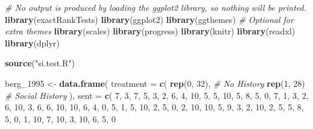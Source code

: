 \documentclass[
]{article}
\newenvironment{Shaded}{\begin{snugshade}}{\end{snugshade}}
\newcommand{\AttributeTok}[1]{\textcolor[rgb]{0.13,0.29,0.53}{#1}}
\newcommand{\CommentTok}[1]{\textcolor[rgb]{0.56,0.35,0.01}{\textit{#1}}}
\newcommand{\DecValTok}[1]{\textcolor[rgb]{0.00,0.00,0.81}{#1}}
\newcommand{\FunctionTok}[1]{\textcolor[rgb]{0.13,0.29,0.53}{\textbf{#1}}}
\newcommand{\NormalTok}[1]{#1}
\newcommand{\OtherTok}[1]{\textcolor[rgb]{0.56,0.35,0.01}{#1}}
\newcommand{\StringTok}[1]{\textcolor[rgb]{0.31,0.60,0.02}{#1}}
\begin{document}
\begin{Shaded}
\begin{Highlighting}[]
\CommentTok{\# No output is produced by loading the ggplot2 library, so nothing will be printed.}
\FunctionTok{library}\NormalTok{(exactRankTests)}
\FunctionTok{library}\NormalTok{(ggplot2)}
\FunctionTok{library}\NormalTok{(ggthemes)   }\CommentTok{\# Optional for extra themes}
\FunctionTok{library}\NormalTok{(scales)}
\FunctionTok{library}\NormalTok{(progress) }
\FunctionTok{library}\NormalTok{(knitr)}
\FunctionTok{library}\NormalTok{(readxl)}
\FunctionTok{library}\NormalTok{(dplyr)}

\FunctionTok{source}\NormalTok{(}\StringTok{"si.test.R"}\NormalTok{)}

\NormalTok{berg\_1995 }\OtherTok{\textless{}{-}} \FunctionTok{data.frame}\NormalTok{(}
    \AttributeTok{treatment =} \FunctionTok{c}\NormalTok{(}
        \FunctionTok{rep}\NormalTok{(}\DecValTok{0}\NormalTok{, }\DecValTok{32}\NormalTok{),  }\CommentTok{\# No History}
        \FunctionTok{rep}\NormalTok{(}\DecValTok{1}\NormalTok{, }\DecValTok{28}\NormalTok{)   }\CommentTok{\# Social History}
\NormalTok{    ),}
    \AttributeTok{sent =} \FunctionTok{c}\NormalTok{(}
        \DecValTok{7}\NormalTok{, }\DecValTok{3}\NormalTok{, }\DecValTok{7}\NormalTok{, }\DecValTok{5}\NormalTok{, }\DecValTok{3}\NormalTok{, }\DecValTok{2}\NormalTok{, }\DecValTok{6}\NormalTok{, }\DecValTok{4}\NormalTok{, }\DecValTok{10}\NormalTok{, }\DecValTok{5}\NormalTok{, }\DecValTok{5}\NormalTok{, }\DecValTok{10}\NormalTok{, }\DecValTok{5}\NormalTok{, }\DecValTok{8}\NormalTok{, }\DecValTok{5}\NormalTok{, }\DecValTok{0}\NormalTok{, }\DecValTok{7}\NormalTok{, }\DecValTok{1}\NormalTok{, }\DecValTok{3}\NormalTok{, }\DecValTok{2}\NormalTok{, }\DecValTok{6}\NormalTok{, }\DecValTok{10}\NormalTok{, }\DecValTok{3}\NormalTok{, }\DecValTok{6}\NormalTok{, }\DecValTok{6}\NormalTok{, }\DecValTok{10}\NormalTok{, }\DecValTok{10}\NormalTok{, }\DecValTok{6}\NormalTok{, }\DecValTok{4}\NormalTok{, }\DecValTok{0}\NormalTok{, }\DecValTok{5}\NormalTok{, }\DecValTok{1}\NormalTok{,}
        \DecValTok{5}\NormalTok{, }\DecValTok{10}\NormalTok{, }\DecValTok{2}\NormalTok{, }\DecValTok{5}\NormalTok{, }\DecValTok{0}\NormalTok{, }\DecValTok{2}\NormalTok{, }\DecValTok{10}\NormalTok{, }\DecValTok{10}\NormalTok{, }\DecValTok{5}\NormalTok{, }\DecValTok{9}\NormalTok{, }\DecValTok{3}\NormalTok{, }\DecValTok{2}\NormalTok{, }\DecValTok{10}\NormalTok{, }\DecValTok{2}\NormalTok{, }\DecValTok{5}\NormalTok{, }\DecValTok{5}\NormalTok{, }\DecValTok{8}\NormalTok{, }\DecValTok{5}\NormalTok{, }\DecValTok{0}\NormalTok{, }\DecValTok{1}\NormalTok{, }\DecValTok{10}\NormalTok{, }\DecValTok{7}\NormalTok{, }\DecValTok{10}\NormalTok{, }\DecValTok{3}\NormalTok{, }\DecValTok{10}\NormalTok{, }\DecValTok{6}\NormalTok{, }\DecValTok{5}\NormalTok{, }\DecValTok{0}

\end{Highlighting}
\end{Shaded}
\end{document}
